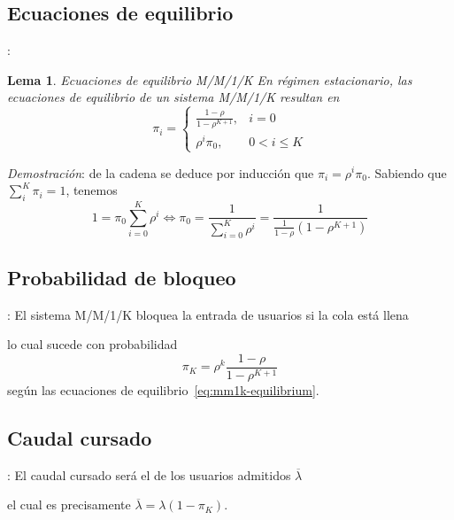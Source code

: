 \documentclass[xcolor={x11names}]{beamer}
\newtheorem{lema}{Lema}[section]
\begin{document}
\subsection{Ecuaciones de equilibrio}
\begin{frame}{\secname: \subsecname}
    \begin{lema}{Ecuaciones de equilibrio M/M/1/K}
        En régimen estacionario, las ecuaciones de
        equilibrio de un sistema M/M/1/K
        resultan en
        \begin{equation}
            \pi_i =
            \begin{cases}
                \frac{1-\rho}{1-\rho^{K+1}}, & i=0\\
                \rho^i\pi_0, & 0<i\leq K
            \end{cases}
            \label{eq:mm1k-equilibrium}
        \end{equation}
    \end{lema}
    \vfill
    \textit{Demostración}: de la cadena se deduce
    por inducción que $\pi_i=\rho^i \pi_0$.
    Sabiendo que $\sum_i^K \pi_i=1$, tenemos
    \begin{equation*}
        1=\pi_0\sum_{i=0}^K\rho^i
        \Longleftrightarrow
        \pi_0=\frac{1}{\sum_{i=0}^K \rho^i}
        =\frac{1}{\frac{1}{1-\rho}(1-\rho^{K+1})}
    \end{equation*}
\end{frame}


\subsection{Probabilidad de bloqueo}
\begin{frame}{\secname: \subsecname}
    El sistema M/M/1/K bloquea la
    entrada de usuarios si
    la cola está llena
    \begin{figure}
        \resizebox{!}{.15\textwidth}{%
            
        }
    \end{figure}
    lo cual sucede con probabilidad
    \begin{equation*}
        \pi_K=\rho^k\frac{1-\rho}{1-\rho^{K+1}}
    \end{equation*}
    según las ecuaciones de
    equilibrio~\eqref{eq:mm1k-equilibrium}.
\end{frame}




\subsection{Caudal cursado}
\begin{frame}{\secname: \subsecname}
    El caudal cursado será el de los
    usuarios admitidos $\overline{\lambda}$
    \begin{figure}
        \resizebox{!}{.25\textwidth}{%
            
        }
    \end{figure}
    el cual es precisamente
    $\overline{\lambda}=\lambda(1-\pi_K)$.
\end{frame}
\end{document}
